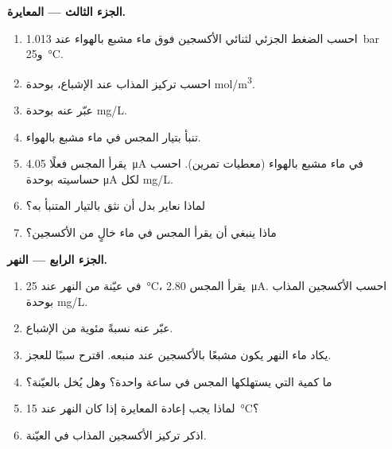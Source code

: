 \begin{problem}
\medskip
\noindent\textbf{الجزء الثالث --- المعايرة.}
\begin{enumerate}[resume]
  \item احسب الضغط الجزئي لثنائي الأكسجين  فوق ماء مشبع بالهواء عند
        \qty{1.013}{bar} و\qty{25}{\degreeCelsius}.
  \item احسب تركيز  المذاب عند الإشباع، بوحدة
        \unit{mol/m^3}.
  \item عبّر عنه بوحدة \unit{mg/L}.
  \item تنبأ بتيار المجس في ماء مشبع بالهواء.
  \item يقرأ المجس فعلًا \qty{4.05}{\micro A} في ماء مشبع بالهواء
        (معطيات تمرين). احسب حساسيته بوحدة \unit{\micro A} لكل
        \unit{mg/L}.
  \item لماذا نعاير بدل أن نثق بالتيار المتنبأ به؟
  \item ماذا ينبغي أن يقرأ المجس في ماء خالٍ من الأكسجين؟
\end{enumerate}

\medskip
\noindent\textbf{الجزء الرابع --- النهر.}
\begin{enumerate}[resume]
  \item في عيّنة من النهر عند \qty{25}{\degreeCelsius}، يقرأ المجس
        \qty{2.80}{\micro A}. احسب الأكسجين المذاب بوحدة \unit{mg/L}.
  \item عبّر عنه نسبةً مئوية من الإشباع.
  \item يكاد ماء النهر يكون مشبعًا بالأكسجين عند منبعه.
        اقترح سببًا للعجز.
  \item ما كمية  التي يستهلكها المجس في ساعة واحدة؟ وهل
        يُخل بالعيّنة؟
  \item لماذا يجب إعادة المعايرة إذا كان النهر عند
        \qty{15}{\degreeCelsius}؟
  \item اذكر تركيز الأكسجين المذاب في العيّنة.
\end{enumerate}
\end{problem}
